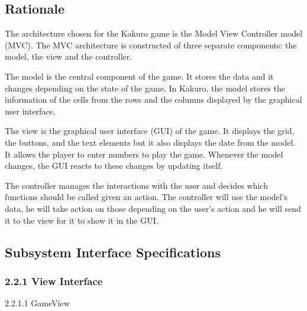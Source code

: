 \documentclass[12pt]{article}
\begin{document}
\subsection{Rationale}

The architecture chosen for the Kakuro game is the Model View Controller model (MVC). The MVC architecture is constructed of three separate components: the model, the view and the controller. \newline

The model is the central component of the game. It stores the data and it changes depending on the state of the game. In Kakuro, the model stores the information of the cells from the rows and the columns displayed by the graphical user interface. \newline

The view is the graphical user interface (GUI) of the game. It displays the grid, the buttons, and the text elements but it also displays the date from the model. It allows the player to enter numbers to play the game. Whenever the model changes, the GUI reacts to these changes by updating itself. \newline

The controller manages the interactions with the user and decides which functions should be called given an action. The controller will use the model’s data, he will take action on those depending on the user’s action and he will send it to the view for it to show it in the GUI.\newline




\subsection{Subsystem Interface Specifications}

\subsubsection{2.2.1 View Interface}

2.2.1.1 GameView \newline
\end{document}

